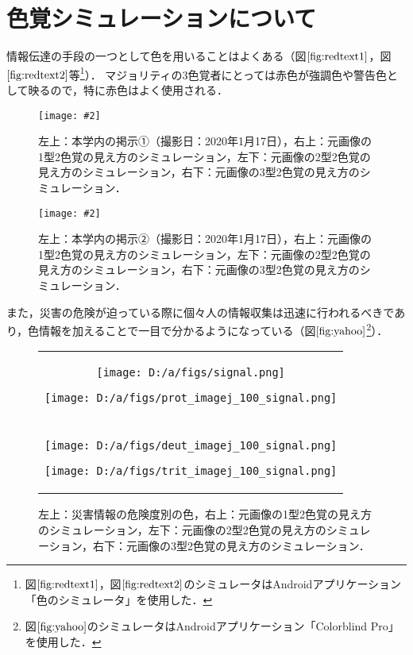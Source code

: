\documentclass[uplatex,paper=a4,fontsize=4.0truemm,jafontsize=4.0truemm,head_space=30.0truemm,foot_space=30.0truemm,baselineskip=8.0truemm,line_length=40zw,gutter=25.0truemm,oneside,openany,fleqn,hanging_panctuation,open_bracket_pos=nibu_tentsuki,dvipdfmx,jis2004,book,titlepage]{jlreq}
\theoremstyle{mystyle}
\newcommand{\captiondot}[1]{\caption{#1．}}
\newcommand{\figureinput}[4]{\begin{figure}[tbp]\centering\texttt{[image: \#2]}\captiondot{#3}\label{fig:#4}\end{figure}}
\newcommand{\mathdisplaystyle}[1]{\(\displaystyle{#1}\)}
\newcommand{\Reference}[1]{\mathdisplaystyle{\ref{#1}}}
\begin{document}
		\section{色覚シミュレーションについて}
			情報伝達の手段の一つとして色を用いることはよくある（図\Reference{fig:redtext1}，図\Reference{fig:redtext2}等\footnote{図\Reference{fig:redtext1}，図\Reference{fig:redtext2}のシミュレータはAndroidアプリケーション「色のシミュレータ」を使用した．}）．
			マジョリティの3色覚者にとっては赤色が強調色や警告色として映るので，特に赤色はよく使用される．
			\figureinput{width=7.5truecm}{D:/a/figs/S__50315266.jpg}{左上：本学内の掲示①（撮影日：2020年1月17日），右上：元画像の1型2色覚の見え方のシミュレーション，左下：元画像の2型2色覚の見え方のシミュレーション，右下：元画像の3型2色覚の見え方のシミュレーション}{redtext1}
			\figureinput{width=7.5truecm}{D:/a/figs/S__50315270.jpg}{左上：本学内の掲示②（撮影日：2020年1月17日），右上：元画像の1型2色覚の見え方のシミュレーション，左下：元画像の2型2色覚の見え方のシミュレーション，右下：元画像の3型2色覚の見え方のシミュレーション}{redtext2}
			また，災害の危険が迫っている際に個々人の情報収集は迅速に行われるべきであり，色情報を加えることで一目で分かるようになっている（図\Reference{fig:yahoo}\footnote{図\protect\Reference{fig:yahoo}のシミュレータはAndroidアプリケーション「Colorblind Pro」を使用した．}\cite{Yahoo2020}）．
			\begin{figure}[tbp]
				\centering
				\begin{tabular}{c}
					\begin{minipage}{0.5\linewidth}
						\centering
						\texttt{[image: D:/a/figs/signal.png]}
					\end{minipage}
					\begin{minipage}{0.5\linewidth}
						\centering
						\texttt{[image: D:/a/figs/prot\_imagej\_100\_signal.png]}
					\end{minipage} \\
					\begin{minipage}{0.06\linewidth}
						\vspace{10truemm}
					\end{minipage} \\
					\begin{minipage}{0.5\linewidth}
						\centering
						\texttt{[image: D:/a/figs/deut\_imagej\_100\_signal.png]}
					\end{minipage}
					\begin{minipage}{0.5\linewidth}
						\centering
						\texttt{[image: D:/a/figs/trit\_imagej\_100\_signal.png]}
					\end{minipage}
				\end{tabular}
				\captiondot{左上：災害情報の危険度別の色，右上：元画像の1型2色覚の見え方のシミュレーション，左下：元画像の2型2色覚の見え方のシミュレーション，右下：元画像の3型2色覚の見え方のシミュレーション}\label{fig:yahoo}
			\end{figure}
\end{document}
